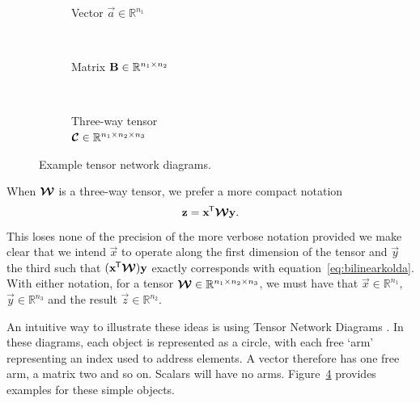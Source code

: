 \begin{figure}
	\centering
	\begin{subfigure}[t]{0.31\textwidth}
	\centering
	\caption{Vector \(\vec{a}\in\mathbb{R}^{n_1}\)}\label{fig:tnd:vec}
	\end{subfigure} ~
	\begin{subfigure}[t]{0.31\textwidth}
	\centering
	\caption{Matrix \(\mathbf{B}\in\mathbb{R}^{n_1 \times n_2}\)}\label{fig:tnd:mat}
	\end{subfigure} ~
	\begin{subfigure}[t]{0.31\textwidth}
	\centering
	\caption{Three-way tensor\\ 
		\(\bm{\mathcal{C}}\in\mathbb{R}^{n_1\times n_2\times n_3}\)}\label{fig:tnd:3ten}
	\end{subfigure}
	\caption{Example tensor network diagrams.}
	\label{fig:tnegs}
\end{figure}

When \(\bm{\mathcal{W}}\) is a three-way tensor, we prefer a more compact notation
\begin{equation}\label{eq:bilintensor}
	\mathbf{z} = \mathbf{x}^{\mkern-1.5mu\mathsf{T}}\bm{\mathcal{W}}\mathbf{y}.
\end{equation} This loses none of the precision of the more verbose notation provided we make clear
that we intend \(\vec{x}\) to operate along the first dimension of the tensor and \(\vec{y}\) the
third such that \((\mathbf{x}^{\mkern-1.5mu\mathsf{T}}\bm{\mathcal{W}})\mathbf{y}\) exactly corresponds with 
equation~\eqref{eq:bilinearkolda}. With either notation, for a tensor 
\(\bm{\mathcal{W}} \in \mathbb{R}^{n_1 \times n_2 \times n_3}\), we must have that 
\(\vec{x}\in \mathbb{R}^{n_1}\), \(\vec{y} \in \mathbb{R}^{n_3}\) and the result 
\(\vec{z}\in\mathbb{R}^{n_2}\).

An intuitive way to illustrate these ideas is using Tensor Network Diagrams
\autocite{Cichocki2016, Orus2014}. In these diagrams, each object is represented
as a circle, with each free `arm' representing an index used to address elements.
A vector therefore has one free arm, a matrix two and so on. Scalars will have
no arms. Figure~\ref{fig:tnegs} provides examples for these simple objects. 

